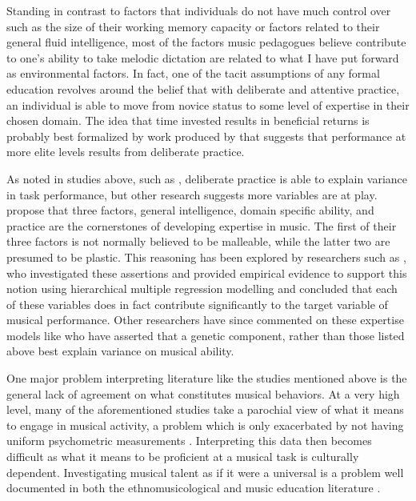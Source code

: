 \documentclass[12pt,]{book}
\begin{document}
Standing in contrast to factors that individuals do not have much control over such as the size of their working memory capacity or factors related to their general fluid intelligence, most of the factors music pedagogues believe contribute to one's ability to take melodic dictation are related to what I have put forward as environmental factors.
In fact, one of the tacit assumptions of any formal education revolves around the belief that with deliberate and attentive practice, an individual is able to move from novice status to some level of expertise in their chosen domain.
The idea that time invested results in beneficial returns is probably best formalized by work produced by \citet{ericssonRoleDeliberatePractice1993} that suggests that performance at more elite levels results from deliberate practice.

As noted in studies above, such as \citet{meinzDeliberatePracticeNecessary2010}, deliberate practice is able to explain variance in task performance, but other research suggests more variables are at play.
\citet{dettermanMoreComprehensiveTheory1999} propose that three factors, general intelligence, domain specific ability, and practice are the cornerstones of developing expertise in music.
The first of their three factors is not normally believed to be malleable, while the latter two are presumed to be plastic.
This reasoning has been explored by researchers such as \citet{ruthsatzBecomingExpertMusical2008}, who investigated these assertions and provided empirical evidence to support this notion using hierarchical multiple regression modelling and concluded that each of these variables does in fact contribute significantly to the target variable of musical performance.
Other researchers have since commented on these expertise models like \citet{mosingPracticeDoesNot2014} who have asserted that a genetic component, rather than those listed above best explain variance on musical ability.

One major problem interpreting literature like the studies mentioned above is the general lack of agreement on what constitutes musical behaviors.
At a very high level, many of the aforementioned studies take a parochial view of what it means to engage in musical activity, a problem which is only exacerbated by not having uniform psychometric measurements \citep{bakerExaminingMusicalSophistication2018a, talaminiMusiciansHaveBetter2017}.
Interpreting this data then becomes difficult as what it means to be proficient at a musical task is culturally dependent.
Investigating musical talent as if it were a universal is a problem well documented in both the ethnomusicological and music education literature \citep{blackingHowMusicalMan2000, murphyHowFarTests1999}.
\end{document}
